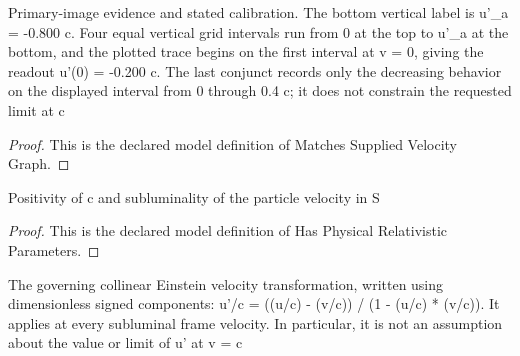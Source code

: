 \begin{definition}
  \label{def:physics:phyx-mini-0595:phyxminiproblems-problemphyxmini0595-matchessuppliedvelocitygraph}
  Primary-image evidence and stated calibration. The bottom vertical label is u'\_a = -0.800 c. Four equal vertical grid intervals run from 0 at the top to u'\_a at the bottom, and the plotted trace begins on the first interval at v = 0, giving the readout u'(0) = -0.200 c. The last conjunct records only the decreasing behavior on the displayed interval from 0 through 0.4 c; it does not constrain the requested limit at c
\end{definition}
\begin{proof}
  This is the declared model definition of Matches Supplied Velocity Graph.
\end{proof}
\begin{definition}
  \label{def:physics:phyx-mini-0595:phyxminiproblems-problemphyxmini0595-hasphysicalrelativisticparameters}
  Positivity of c and subluminality of the particle velocity in S
\end{definition}
\begin{proof}
  This is the declared model definition of Has Physical Relativistic Parameters.
\end{proof}
\begin{definition}
  \label{def:physics:phyx-mini-0595:phyxminiproblems-problemphyxmini0595-obeyscollineareinsteinvelocitytransformation}
  The governing collinear Einstein velocity transformation, written using dimensionless signed components: u'/c = ((u/c) - (v/c)) / (1 - (u/c) * (v/c)). It applies at every subluminal frame velocity. In particular, it is not an assumption about the value or limit of u' at v = c
\end{definition}
